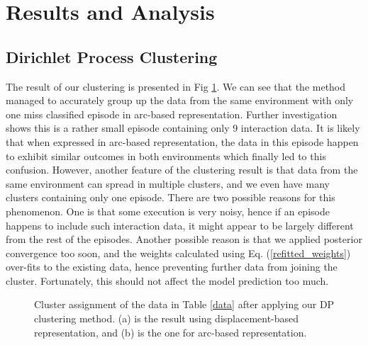 \documentclass[journal]{IEEEtran}
\begin{document}











\section{Results and Analysis}

\subsection{Dirichlet Process Clustering}
The result of our clustering is presented in Fig \ref{clustering_results}.
We can see that the method managed to accurately group up the data from the same environment with only one miss classified episode in arc-based representation.
Further investigation shows this is a rather small episode containing only 9 interaction data. 
It is likely that when expressed in arc-based representation, the data in this episode happen to exhibit similar outcomes in both environments which finally led to this confusion.
However, another feature of the clustering result is that data from the same environment can spread in multiple clusters, and we even have many clusters containing only one episode.
There are two possible reasons for this phenomenon.
One is that some execution is very noisy, hence if an episode happens to include such interaction data, it might appear to be largely different from the rest of the episodes.
Another possible reason is that we applied posterior convergence too soon, and the weights calculated using Eq. (\ref{refitted_weights}) over-fits to the existing data, hence preventing further data from joining the cluster.
Fortunately, this should not affect the model prediction too much.


\begin{figure}[h]
\centering
{}
{}
\caption{Cluster assignment of the data in Table \ref{data} after applying our DP clustering method.
(a) is the result using displacement-based representation, and (b) is the one for arc-based representation.}
\label{clustering_results}
\end{figure}
\end{document}
